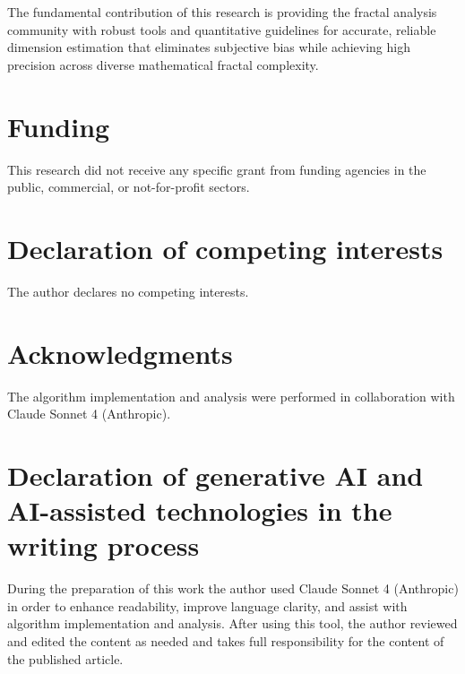\documentclass[preprint,12pt]{elsarticle}
\begin{document}
The fundamental contribution of this research is providing the fractal analysis community with robust tools and quantitative guidelines for accurate, reliable dimension estimation that eliminates subjective bias while achieving high precision across diverse mathematical fractal complexity.

\section*{Funding}
This research did not receive any specific grant from funding agencies in the public, commercial, or not-for-profit sectors.

\section*{Declaration of competing interests}
The author declares no competing interests.

\section*{Acknowledgments}
The algorithm implementation and analysis were performed in collaboration with Claude Sonnet 4 (Anthropic).

\section*{Declaration of generative AI and AI-assisted technologies in the writing process}
During the preparation of this work the author used Claude Sonnet 4 (Anthropic) in order to enhance readability, improve language clarity, and assist with algorithm implementation and analysis. After using this tool, the author reviewed and edited the content as needed and takes full responsibility for the content of the published article.

\appendix


\end{document}
